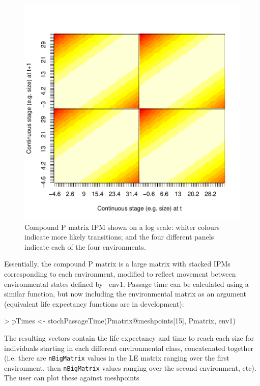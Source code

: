 \documentclass{article}
\begin{document}
\begin{figure}
\begin{center}
\includegraphics{IPMpack_Vignette-figCompound}
\end{center}
\caption{Compound P matrix IPM shown on a log scale: whiter colours indicate
  more likely transitions; and the four different panels indicate each
  of the four environments.}
\label{fig:five}
\end{figure}
Essentially, the compound P matrix is a large matrix with stacked IPMs
corresponding to each environment, modified to reflect movement
between environmental states defined by {\ env1}. Passage time can be
calculated using a similar function, but now including the environmental
matrix as an argument (equivalent life expectancy functions are in development): 
\begin{Schunk}
\begin{Sinput}
> pTimes <- stochPassageTime(Pmatrix@meshpoints[15], Pmatrix, env1)
\end{Sinput}
\end{Schunk}
The resulting vectors contain the life expectancy and time to reach each size for individuals starting in each different environmental class, concatenated together (i.e. there are {\tt nBigMatrix} values in the LE matrix ranging over the first environment, then {\tt nBigMatrix} values ranging over the second environment, etc). The user can plot these against meshpoints 
\end{document}
